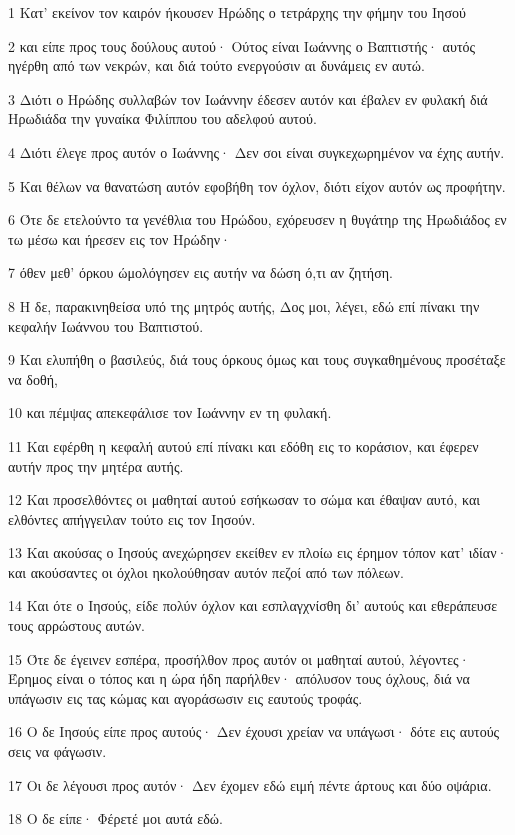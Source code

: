 \par 1 Κατ' εκείνον τον καιρόν ήκουσεν Ηρώδης ο τετράρχης την φήμην του Ιησού
\par 2 και είπε προς τους δούλους αυτού· Ούτος είναι Ιωάννης ο Βαπτιστής· αυτός ηγέρθη από των νεκρών, και διά τούτο ενεργούσιν αι δυνάμεις εν αυτώ.
\par 3 Διότι ο Ηρώδης συλλαβών τον Ιωάννην έδεσεν αυτόν και έβαλεν εν φυλακή διά Ηρωδιάδα την γυναίκα Φιλίππου του αδελφού αυτού.
\par 4 Διότι έλεγε προς αυτόν ο Ιωάννης· Δεν σοι είναι συγκεχωρημένον να έχης αυτήν.
\par 5 Και θέλων να θανατώση αυτόν εφοβήθη τον όχλον, διότι είχον αυτόν ως προφήτην.
\par 6 Ότε δε ετελούντο τα γενέθλια του Ηρώδου, εχόρευσεν η θυγάτηρ της Ηρωδιάδος εν τω μέσω και ήρεσεν εις τον Ηρώδην·
\par 7 όθεν μεθ' όρκου ώμολόγησεν εις αυτήν να δώση ό,τι αν ζητήση.
\par 8 Η δε, παρακινηθείσα υπό της μητρός αυτής, Δος μοι, λέγει, εδώ επί πίνακι την κεφαλήν Ιωάννου του Βαπτιστού.
\par 9 Και ελυπήθη ο βασιλεύς, διά τους όρκους όμως και τους συγκαθημένους προσέταξε να δοθή,
\par 10 και πέμψας απεκεφάλισε τον Ιωάννην εν τη φυλακή.
\par 11 Και εφέρθη η κεφαλή αυτού επί πίνακι και εδόθη εις το κοράσιον, και έφερεν αυτήν προς την μητέρα αυτής.
\par 12 Και προσελθόντες οι μαθηταί αυτού εσήκωσαν το σώμα και έθαψαν αυτό, και ελθόντες απήγγειλαν τούτο εις τον Ιησούν.
\par 13 Και ακούσας ο Ιησούς ανεχώρησεν εκείθεν εν πλοίω εις έρημον τόπον κατ' ιδίαν· και ακούσαντες οι όχλοι ηκολούθησαν αυτόν πεζοί από των πόλεων.
\par 14 Και ότε ο Ιησούς, είδε πολύν όχλον και εσπλαγχνίσθη δι' αυτούς και εθεράπευσε τους αρρώστους αυτών.
\par 15 Ότε δε έγεινεν εσπέρα, προσήλθον προς αυτόν οι μαθηταί αυτού, λέγοντες· Έρημος είναι ο τόπος και η ώρα ήδη παρήλθεν· απόλυσον τους όχλους, διά να υπάγωσιν εις τας κώμας και αγοράσωσιν εις εαυτούς τροφάς.
\par 16 Ο δε Ιησούς είπε προς αυτούς· Δεν έχουσι χρείαν να υπάγωσι· δότε εις αυτούς σεις να φάγωσιν.
\par 17 Οι δε λέγουσι προς αυτόν· Δεν έχομεν εδώ ειμή πέντε άρτους και δύο οψάρια.
\par 18 Ο δε είπε· Φέρετέ μοι αυτά εδώ.
